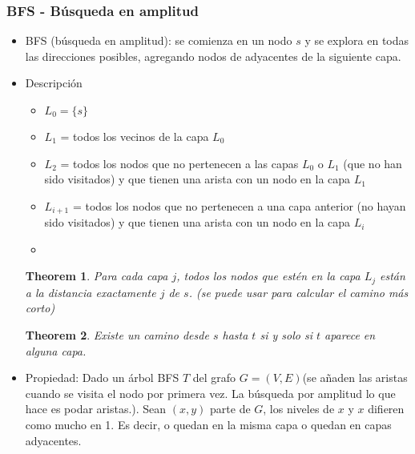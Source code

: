 \documentclass[12pt, fleqn]{article}
\newtheorem{theorem}{Theorem}[section]
\begin{document}
            \subsubsection{BFS - Búsqueda en amplitud}
                \begin{itemize}
                    \item BFS (búsqueda en amplitud): se comienza en un nodo $s$ y se explora en todas las direcciones posibles, 
                        agregando nodos de adyacentes de la siguiente capa.
                    \item Descripción
                        \begin{itemize}
                            \item $L_0 = \{s\}$
                            \item $L_1$ = todos los vecinos de la capa $L_0$
                            \item $L_2$ = todos los nodos que no pertenecen a las capas $L_0$ o $L_1$ (que no han sido visitados) 
                                y que tienen una arista con un nodo en la capa $L_1$
                            \item $L_{i+1}$ = todos los nodos que no pertenecen a una capa anterior (no hayan sido visitados) 
                                y que tienen una arista con un nodo en la capa $L_i$
                            \item 
                        \end{itemize}
                        \begin{theorem}
                            Para cada capa $j$, todos los nodos que estén en la capa $L_j$ están a la distancia exactamente $j$ de $s$. 
                            (se puede usar para calcular el camino más corto)
                        \end{theorem}
                        \begin{theorem}
                            Existe un camino desde $s$ hasta $t$ si y solo si $t$ aparece en alguna capa.
                        \end{theorem}
                    \item Propiedad: Dado un árbol BFS $T$ del grafo $G = (V, E)$(se añaden las aristas cuando se visita el nodo por primera vez. 
                        La búsqueda por amplitud lo que hace es podar aristas.). Sean $(x,y)$ parte de $G$, los niveles de $x$ y $x$ difieren como mucho en 1.
                        Es decir, o quedan en la misma capa o quedan en capas adyacentes.
                \end{itemize}
\end{document}

